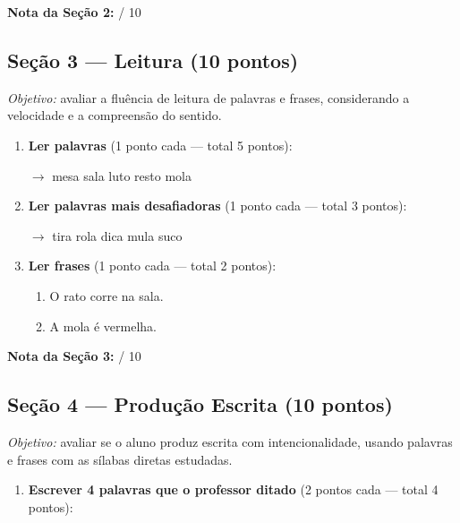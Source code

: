\begin{avaliacao}
\medskip
\noindent\textbf{Nota da Seção 2:} \underline{\hspace{1cm}} / 10

\subsection*{Seção 3 — Leitura (10 pontos)}

\textit{Objetivo:} avaliar a fluência de leitura de palavras e frases,
considerando a velocidade e a compreensão do sentido.

\begin{enumerate}[resume]
  \item \textbf{Ler palavras} (1 ponto cada — total 5 pontos):

  \begin{center}
  $\rightarrow$ mesa \quad sala \quad luto \quad resto \quad mola
  \end{center}

  \item \textbf{Ler palavras mais desafiadoras} (1 ponto cada — total 3 pontos):

  \begin{center}
  $\rightarrow$ tira \quad rola \quad dica \quad mula \quad suco
  \end{center}

  \item \textbf{Ler frases} (1 ponto cada — total 2 pontos):

  \begin{enumerate}[label=\arabic*., leftmargin=1.5cm]
    \item O rato corre na sala.
    \item A mola é vermelha.
  \end{enumerate}
\end{enumerate}

\medskip
\noindent\textbf{Nota da Seção 3:} \underline{\hspace{1cm}} / 10

\subsection*{Seção 4 — Produção Escrita (10 pontos)}

\textit{Objetivo:} avaliar se o aluno produz escrita com intencionalidade,
usando palavras e frases com as sílabas diretas estudadas.

\begin{enumerate}[resume]
  \item \textbf{Escrever 4 palavras que o professor ditado} (2 pontos cada — total 4 pontos):


\end{enumerate}
\end{avaliacao}

